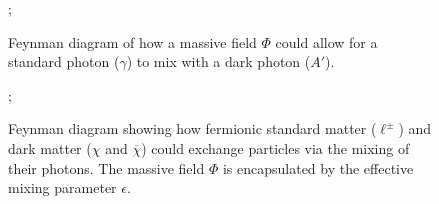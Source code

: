 \begin{subfigure}[t]{0.48\textwidth}
    \centering
    ;
    \caption{Feynman diagram of how a massive field $\Phi$ could allow for a standard photon ($\gamma$)
        to mix with a dark photon ($A'$).}
    \label{fig:photon-mixing:with-field}
\end{subfigure}
\hfill
\begin{subfigure}[t]{0.48\textwidth}
    \centering
    ;
    \caption{Feynman diagram showing how fermionic standard matter ($\ell^\pm$) and dark matter ($\chi$ and $\overline{\chi}$)
        could exchange particles via the mixing of their photons. The massive field $\Phi$ is encapsulated by the effective mixing
        parameter $\epsilon$.}
    \label{fig:photon-mixing:with-matter}
\end{subfigure}